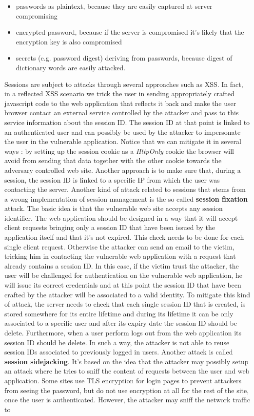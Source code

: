 \begin{itemize}
\item passwords as plaintext, because they are easily captured at server compromising
\item encrypted password, because if the server is compromised it's likely that the encryption key is also compromised
\item secrets (e.g. password digest) deriving from passwords, because digest of dictionary words are easily attacked.
\end{itemize} 
Sessions are subject to attacks through several approaches such as XSS. In fact, in a reflected XSS scenario we trick the user in sending appropriately crafted javascript code to the web application that reflects it back and make the user browser contact an external service controlled by the attacker and pass to this service information about the session ID. The session ID at that point is linked to an authenticated user and can possibly be used by the attacker to impersonate the user in the vulnerable application. Notice that we can mitigate it in several ways : by setting up the session cookie as a \textit{HttpOnly} cookie the browser will avoid from sending that data together with the other cookie towards the adversary controlled web site. Another approach is to make sure that, during a session, the session ID is linked to a specific IP from which the user was contacting the server. Another kind of attack related to sessions that stems from a wrong implementation of session management is the so called \textbf{session fixation} attack. The basic idea is that the vulnerable web site accepts any session identifier. The web application should be designed in a way that it will accept client requests bringing only a session ID that have been issued by the application itself and that it's not expired. This check needs to be done for each single client request. Otherwise the attacker can send an email to the victim, tricking him in contacting the vulnerable web application with a request that already contains a session ID. In this case, if the victim trust the attacker, the user will be challenged for authentication on the vulnerable web application, he will issue its correct credentials and at this point the session ID that have been crafted by the attacker will be associated to a valid identity. To mitigate this kind of attack, the server needs to check that each single session ID that is created, is stored somewhere for its entire lifetime and during its lifetime it can be only associated to a specific user and after its expiry date the session ID should be delete. Furthermore, when a user perform logs out from the web application its session ID should be delete. In such a way, the attacker is not able to reuse session IDs associated to previously logged in users. Another attack is called \textbf{session sidejacking}. It's based on the idea that the attacker may possibly setup an attack where he tries to sniff the content of requests between the user and web application. Some sites use TLS encryption for login pages to prevent attackers from seeing the password, but do not use encryption at all for the rest of the site, once the user is authenticated. However, the attacker may sniff the network traffic to 